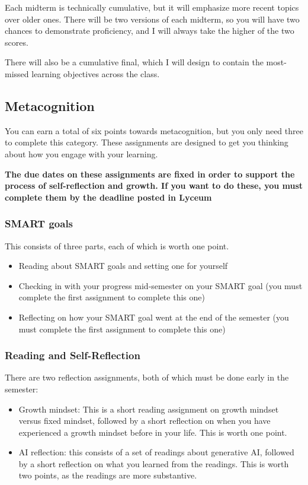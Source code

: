 \documentclass[
  letterpaper,
  DIV=11,
  numbers=noendperiod]{scrartcl}
\providecommand{\tightlist}{%
  \setlength{\itemsep}{0pt}\setlength{\parskip}{0pt}}
\begin{document}
Each midterm is technically cumulative, but it will emphasize more
recent topics over older ones. There will be two versions of each
midterm, so you will have two chances to demonstrate proficiency, and I
will always take the higher of the two scores.

There will also be a cumulative final, which I will design to contain
the most-missed learning objectives across the class.

\subsection{Metacognition}\label{metacognitiongrade}

You can earn a total of six points towards metacognition, but you only
need three to complete this category. These assignments are designed to
get you thinking about how you engage with your learning.

\textbf{The due dates on these assignments are fixed in order to support
the process of self-reflection and growth. If you want to do these, you
must complete them by the deadline posted in Lyceum}

\subsubsection{SMART goals}

This consists of three parts, each of which is worth one point.

\begin{itemize}
\tightlist
\item
  Reading about SMART goals and setting one for yourself
\item
  Checking in with your progress mid-semester on your SMART goal (you
  must complete the first assignment to complete this one)
\item
  Reflecting on how your SMART goal went at the end of the semester (you
  must complete the first assignment to complete this one)
\end{itemize}

\subsubsection{Reading and Self-Reflection}

There are two reflection assignments, both of which must be done early
in the semester:

\begin{itemize}
\tightlist
\item
  Growth mindset: This is a short reading assignment on growth mindset
  versus fixed mindset, followed by a short reflection on when you have
  experienced a growth mindset before in your life. This is worth one
  point.
\item
  AI reflection: this consists of a set of readings about generative AI,
  followed by a short reflection on what you learned from the readings.
  This is worth two points, as the readings are more substantive.
\end{itemize}
\end{document}
